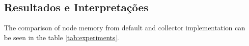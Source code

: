 \subsection{Resultados e Interpretações}
The comparison of node memory from default and collector implementation can be seen in the table \ref{tab:experiments}.

%
%
%
%
%
%
